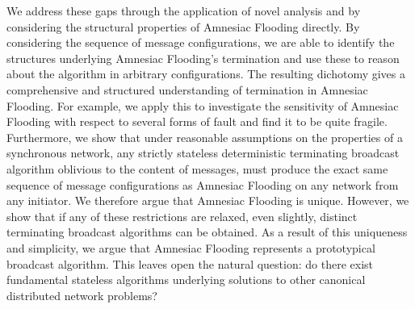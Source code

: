 We address these gaps through the application of novel analysis and by considering the structural properties of Amnesiac Flooding directly. 
By considering the sequence of message configurations, we are able to identify the structures underlying Amnesiac Flooding's termination and use these to reason about the algorithm in arbitrary configurations.
The resulting dichotomy gives a comprehensive and structured understanding of termination in Amnesiac Flooding.
For example, we apply this to investigate the sensitivity of Amnesiac Flooding with respect to several forms of fault and find it to be quite fragile.
Furthermore, we show that under reasonable assumptions on the properties of a synchronous network, any strictly stateless deterministic terminating broadcast algorithm oblivious to the content of messages, must produce the exact same sequence of message configurations as Amnesiac Flooding on any network from any initiator.
We therefore argue that Amnesiac Flooding is unique.
However, we show that if any of these restrictions are relaxed, even slightly, distinct terminating broadcast algorithms can be obtained.
As a result of this uniqueness and simplicity, we argue that Amnesiac Flooding represents a prototypical broadcast algorithm.
This leaves open the natural question: do there exist fundamental stateless algorithms underlying solutions to other canonical distributed network problems?


